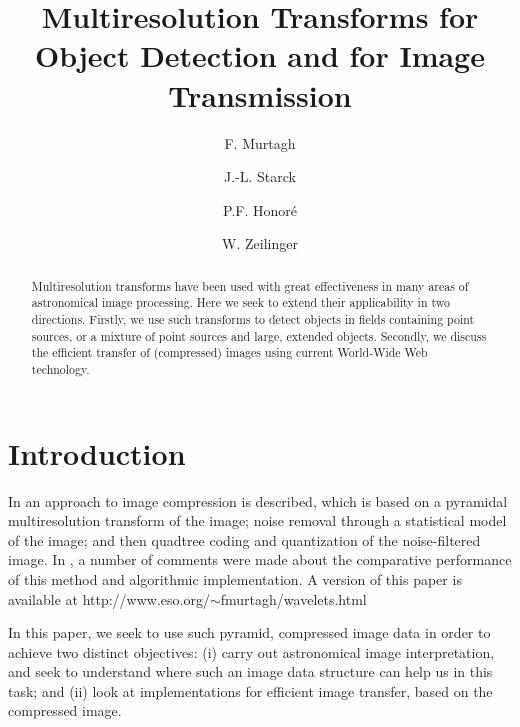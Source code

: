 

 
\begin{frontmatter}
\title{Multiresolution Transforms for Object Detection and for Image 
Transmission}

\author{F. Murtagh}
\address{Space Telescope -- European Coordinating Facility, European Southern
Observatory, D-85748 Garching, Germany.  (Affiliated to
Astrophysics Division, Space Science Department, European Space Agency.)}
\author{J.-L. Starck}
\address{CEA, DSM/DAPNIA, CE-Saclay, F-91191 Gif-sur-Yvette Cedex, France.}
\author{P.F. Honor\'e}
\address{CEA, DSM/DAPNIA, CE-Saclay, F-91191 Gif-sur-Yvette Cedex, France.}
\author{W. Zeilinger}
\address{Institut f\"ur Astronomie, Universit\"at Wien, A-1180 Austria.}

\begin{abstract}
Multiresolution transforms have been used with great effectiveness in many 
areas of astronomical image processing.  Here we seek to extend their 
applicability in two directions.  Firstly, we use such transforms to 
detect objects in fields containing point sources, or a mixture of point 
sources and large, extended objects.  Secondly, we discuss the efficient 
transfer of (compressed) images using current World-Wide Web technology.
\end{abstract}
 
\end{frontmatter}

\section{Introduction}

In \cite{starck95} an approach to image compression is described, which is 
based on a pyramidal multiresolution transform of the image; noise removal
through a statistical model of the image; and then quadtree coding and 
quantization of the noise-filtered image.  In \cite{white-nice95}, a number 
of comments were made about the comparative performance of this method and
algorithmic implementation.  A version of this paper is available at  
http://www.eso.org/$\sim$fmurtagh/wavelets.html 

In this paper, we seek to use such pyramid, compressed image data in order
to achieve two distinct objectives: (i) carry out astronomical image 
interpretation, and seek to understand where such an image data structure
can help us in this task; and (ii) look at implementations for efficient
image transfer, based on the compressed image.  

